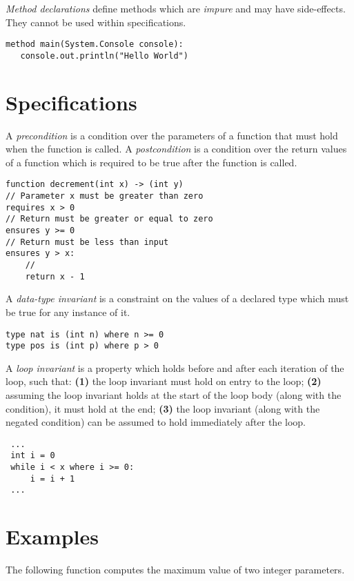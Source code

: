 \documentclass[a4paper,10pt,twcolumn]{article}
\begin{document}
{\em Method declarations} define methods which are {\em impure} and
may have side-effects.  They cannot be used within specifications.

\begin{lstlisting}
method main(System.Console console):
   console.out.println("Hello World")
\end{lstlisting}

\section*{Specifications}

A {\em precondition} is a condition over the parameters of a function
that must hold when the function is called.  A {\em
  postcondition} is a condition over the return values of a function
which is required to be true after the function is called.

\begin{lstlisting}
function decrement(int x) -> (int y) 
// Parameter x must be greater than zero
requires x > 0
// Return must be greater or equal to zero
ensures y >= 0
// Return must be less than input
ensures y > x:
    //
    return x - 1
\end{lstlisting}

A {\em data-type invariant} is a constraint on the values of a
declared type which must be true for any instance of it.

\begin{lstlisting}
type nat is (int n) where n >= 0
type pos is (int p) where p > 0
\end{lstlisting}

A {\em loop invariant} is a property which holds before and after each
iteration of the loop, such that: {\bf (1)} the loop invariant must hold on
entry to the loop; {\bf (2)} assuming the loop invariant holds at the start of
the loop body (along with the condition), it must hold at the end; {\bf (3)}
the loop invariant (along with the negated condition) can be assumed
to hold immediately after the loop.
\newline
\begin{lstlisting}
 ...
 int i = 0
 while i < x where i >= 0:
     i = i + 1 
 ...
\end{lstlisting}


\section*{Examples}

The following function computes the maximum value of two integer parameters.
\end{document}
